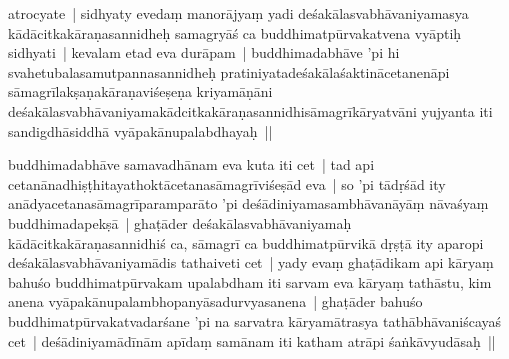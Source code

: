 \documentclass[article,12pt,a4paper]{memoir}%
\newcounter{parCount}
\begin{document}
	  \pstart \leavevmode%
	\label{thakur75-41.12}atrocyate | sidhyaty evedaṃ manorājyaṃ yadi deśakālasvabhāvaniyamasya kādācitkakāraṇasannidheḥ samagryāś ca buddhimatpūrvakatvena vyāptiḥ sidhyati | kevalam etad eva durāpam | buddhimadabhāve 'pi hi svahetubalasamutpannasannidheḥ pratiniyatadeśakālaśaktinācetanenāpi sāmagrīlakṣaṇakāraṇaviśeṣeṇa kriyamāṇāni deśakālasvabhāvaniyamakādcitkakāraṇasannidhisāmagrīkāryatvāni yujyanta iti sandigdhāsiddhā vyāpakānupalabdhayaḥ ||
	{}
	\pend%
      

	  \pstart \leavevmode%
	\label{thakur75-41.18}buddhimadabhāve samavadhānam eva kuta iti cet | tad api cetanānadhiṣṭhitayathoktācetanasāmagrīviśeṣād eva | so 'pi tādṛśād ity anādyacetanasāmagrīparamparāto 'pi deśādiniyamasambhāvanāyāṃ nāvaśyaṃ buddhimadapekṣā | ghaṭāder deśakālasvabhāvaniyamaḥ kādācitkakāraṇasannidhiś ca, sāmagrī ca buddhimatpūrvikā dṛṣṭā ity aparopi deśakālasvabhāvaniyamādis tathaiveti cet | yady evaṃ ghaṭādikam api kāryaṃ bahuśo buddhimatpūrvakam upalabdham iti sarvam eva kāryaṃ tathāstu, kim anena vyāpakānupalambhopanyāsadurvyasanena | ghaṭāder bahuśo buddhimatpūrvakatvadarśane 'pi na sarvatra kāryamātrasya tathābhāvaniścayaś cet | deśādiniyamādīnām apīdaṃ samānam iti katham atrāpi śaṅkāvyudāsaḥ ||
	{}
	\pend%
      
\end{document}
